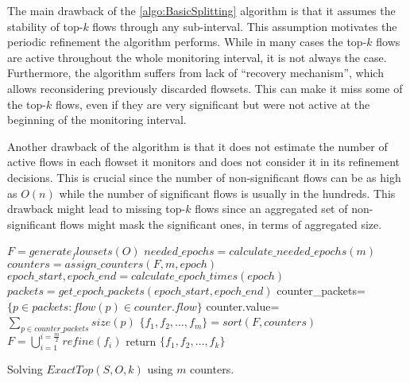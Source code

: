 The main drawback of the \ref{algo:BasicSplitting} algorithm is that it assumes the stability of top-$k$ flows through any sub-interval. This assumption motivates the periodic refinement the algorithm performs.
While in many cases the top-$k$ flows are active throughout the whole monitoring interval, it is not always the case. Furthermore, the algorithm suffers from lack of ``recovery mechanism'', which allows reconsidering previously discarded flowsets. This can make it miss some of the top-$k$ flows, even if they are very significant but were not active at the beginning of the monitoring interval.

Another drawback of the algorithm is that it does not estimate the number of active flows in each flowset it monitors and does not consider it in its refinement decisions. This is crucial since the number of non-significant flows can be as high as $O(n)$ while the number of significant flows is usually in the hundreds. This drawback might lead to missing top-$k$ flows since an aggregated set of non-significant flows might mask the significant ones, in terms of aggregated size.

\begin{algorithm}
    $F = generate_flowsets(O)$\;
    $needed\_epochs=calculate\_needed\_epochs(m)$\;
    {
        $counters=assign\_counters(F, m, epoch)$\;
        $epoch\_start, epoch\_end=calculate\_epoch\_times(epoch)$\;
        $packets=get\_epoch\_packets(epoch\_start, epoch\_end)$\;
         {
            counter\_packets=$\{p\in packets : flow(p)\in counter.flow\}$\;
            counter.value=$\sum_{p\in counter\_packets}size(p)$\;
        }
        $\{f_1,f_2,\dots,f_m\}=sort(F, counters)$\;
        $F=\bigcup_{i=1}^{i=\frac{m}{2}}refine(f_i)$\;
    }
    return $\{f_1,f_2,\dots,f_k\}$
    \caption{Solving $ExactTop(S,O,k)$ using $m$ counters.}
    \label{algo:BasicSplitting}
\end{algorithm}
